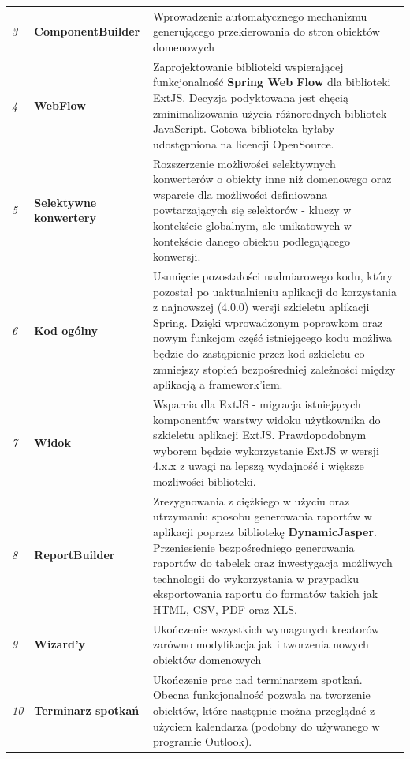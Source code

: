 \begin{center}
\begin{longtable}{|l|l|p{10cm}|}
			\emph{3}					&
			\textbf{ComponentBuilder}	&
			Wprowadzenie automatycznego mechanizmu generującego przekierowania do stron obiektów domenowych
										\tabularnewline
										
			\emph{4}					&
			\textbf{WebFlow}			&
			Zaprojektowanie biblioteki wspierającej 
			funkcjonalność \textbf{Spring Web Flow} dla biblioteki ExtJS. Decyzja podyktowana jest 
			chęcią zminimalizowania użycia różnorodnych bibliotek JavaScript. Gotowa biblioteka
			byłaby udostępniona na licencji OpenSource.
										\tabularnewline
			\emph{5}						&
			\textbf{Selektywne konwertery}	&
			Rozszerzenie możliwości selektywnych konwerterów o obiekty inne niż domenowego oraz
			wsparcie dla możliwości definiowana powtarzających się selektorów - kluczy w kontekście
			globalnym, ale unikatowych w kontekście danego obiektu podlegającego konwersji.
										\tabularnewline
			\emph{6}						&
			\textbf{Kod ogólny}				&
			Usunięcie pozostałości nadmiarowego kodu, który pozostał po uaktualnieniu aplikacji
			do korzystania z najnowszej (4.0.0) wersji szkieletu aplikacji Spring. Dzięki wprowadzonym 
			poprawkom oraz nowym funkcjom część istniejącego kodu możliwa będzie do zastąpienie
			przez kod szkieletu co zmniejszy stopień bezpośredniej zależności między aplikacją a framework'iem.
											\tabularnewline
			\emph{7}						&
			\textbf{Widok}					&
			Wsparcia dla ExtJS - migracja istniejących komponentów warstwy widoku użytkownika do 
			szkieletu aplikacji ExtJS. Prawdopodobnym wyborem będzie wykorzystanie ExtJS w wersji 4.x.x z uwagi
			na lepszą wydajność i większe możliwości biblioteki. 
											\tabularnewline
			\emph{8}						&
			\textbf{ReportBuilder}			&
			Zrezygnowania z ciężkiego w użyciu oraz utrzymaniu sposobu generowania raportów w aplikacji poprzez
			bibliotekę \textbf{DynamicJasper}. Przeniesienie bezpośredniego generowania raportów do tabelek oraz
			inwestygacja możliwych technologii do wykorzystania w przypadku eksportowania raportu do formatów takich jak
			HTML, CSV, PDF oraz XLS.		
											\tabularnewline		
			\emph{9}						&
			\textbf{Wizard'y}				&
			Ukończenie wszystkich wymaganych kreatorów zarówno modyfikacja jak i tworzenia nowych obiektów domenowych	
											\tabularnewline	
			\emph{10}						&
			\textbf{Terminarz spotkań}		&
			Ukończenie prac nad terminarzem spotkań. Obecna funkcjonalność pozwala na tworzenie obiektów, które następnie
			można przeglądać z użyciem kalendarza (podobny do używanego w programie Outlook). 	
											\tabularnewline								
		\end{longtable}
		\label{app:changes_in_future}
	\end{center}
		
